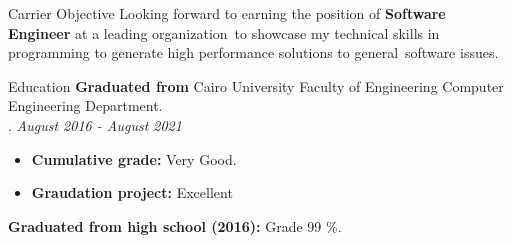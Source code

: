 \documentclass{resume}
\begin{document}

\begin{rSection}{Carrier Objective}
    Looking forward to earning the position of \textbf{Software Engineer} at a leading organization\
    to showcase my technical skills in programming to generate high performance solutions to general\ 
    software issues.
\end{rSection}


\begin{rSection}{Education}
    \textbf{Graduated from} Cairo University Faculty of Engineering Computer Engineering Department.\\ . \hfill {\em August 2016 - August 2021}
    \begin{itemize}
        \item \textbf{Cumulative grade:} Very Good. 
        \item \textbf{Graudation project:} Excellent\\
    \end{itemize}

\textbf{Graduated from high school (2016):} Grade 99 \%.

\end{rSection}

\end{document}

